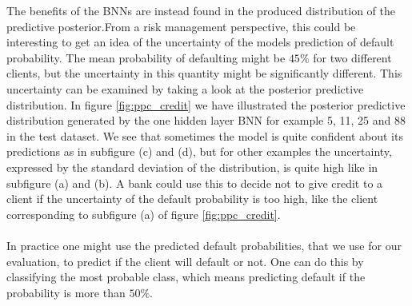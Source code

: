 \begin{table} 
\caption{Performance measurement for Bayesian neural network models on credit card default data. The Python code used to implement these Bayesian neural networks can be seen in appendix \ref{app:Credit_BNN}.}
\label{tab:credit_BNN_performance}
\end{table}
\noindent
The benefits of the BNNs are instead found in the produced distribution of the predictive posterior.From a risk management perspective, this could be interesting to get an idea of the uncertainty of the models prediction of default probability. The mean probability of defaulting might be $45 \%$ for two different clients, but the uncertainty in this quantity might be significantly different. This uncertainty can be examined by taking a look at the posterior predictive distribution. In figure \ref{fig:ppc_credit} we have illustrated the posterior predictive distribution generated by the one hidden layer BNN for example 5, 11, 25 and 88 in the test dataset. We see that sometimes the model is quite confident about its predictions as in subfigure (c) and (d), but for other examples the uncertainty, expressed by the standard deviation of the distribution, is quite high like in subfigure (a) and (b). A bank could use this to decide not to give credit to a client if the uncertainty of the default probability is too high, like the client corresponding to subfigure (a) of figure \ref{fig:ppc_credit}.
\\
\\
In practice one might use the predicted default probabilities, that we use for our evaluation, to predict if the client will default or not. One can do this by classifying the most probable class, which means predicting default if the probability is more than $50 \%$.
